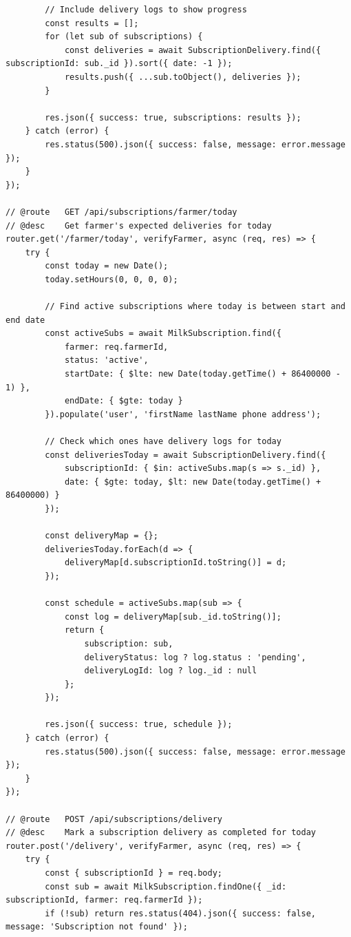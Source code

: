 \documentclass[12pt,a4paper]{report}
\begin{document}
\begin{lstlisting}
        // Include delivery logs to show progress
        const results = [];
        for (let sub of subscriptions) {
            const deliveries = await SubscriptionDelivery.find({ subscriptionId: sub._id }).sort({ date: -1 });
            results.push({ ...sub.toObject(), deliveries });
        }

        res.json({ success: true, subscriptions: results });
    } catch (error) {
        res.status(500).json({ success: false, message: error.message });
    }
});

// @route   GET /api/subscriptions/farmer/today
// @desc    Get farmer's expected deliveries for today
router.get('/farmer/today', verifyFarmer, async (req, res) => {
    try {
        const today = new Date();
        today.setHours(0, 0, 0, 0);

        // Find active subscriptions where today is between start and end date
        const activeSubs = await MilkSubscription.find({
            farmer: req.farmerId,
            status: 'active',
            startDate: { $lte: new Date(today.getTime() + 86400000 - 1) }, 
            endDate: { $gte: today }
        }).populate('user', 'firstName lastName phone address');

        // Check which ones have delivery logs for today
        const deliveriesToday = await SubscriptionDelivery.find({
            subscriptionId: { $in: activeSubs.map(s => s._id) },
            date: { $gte: today, $lt: new Date(today.getTime() + 86400000) }
        });

        const deliveryMap = {};
        deliveriesToday.forEach(d => {
            deliveryMap[d.subscriptionId.toString()] = d;
        });

        const schedule = activeSubs.map(sub => {
            const log = deliveryMap[sub._id.toString()];
            return {
                subscription: sub,
                deliveryStatus: log ? log.status : 'pending',
                deliveryLogId: log ? log._id : null
            };
        });

        res.json({ success: true, schedule });
    } catch (error) {
        res.status(500).json({ success: false, message: error.message });
    }
});

// @route   POST /api/subscriptions/delivery
// @desc    Mark a subscription delivery as completed for today
router.post('/delivery', verifyFarmer, async (req, res) => {
    try {
        const { subscriptionId } = req.body;
        const sub = await MilkSubscription.findOne({ _id: subscriptionId, farmer: req.farmerId });
        if (!sub) return res.status(404).json({ success: false, message: 'Subscription not found' });


\end{lstlisting}
\end{document}
